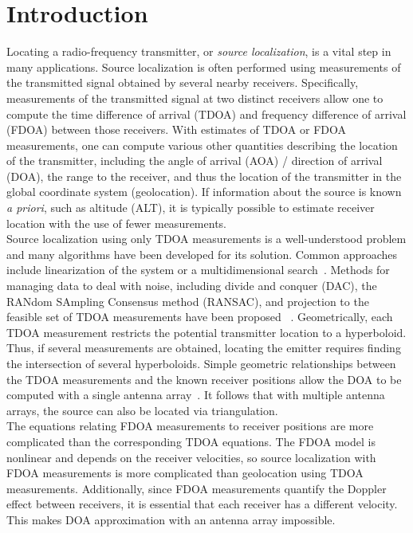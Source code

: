 \section{Introduction}
\label{s:intro}
Locating a radio-frequency transmitter, or \emph{source localization}, is a vital step in many applications. Source localization is often performed using measurements of the transmitted signal obtained by several nearby receivers. Specifically, measurements of the transmitted signal at two distinct receivers allow one to compute the time difference of arrival (TDOA) and frequency difference of arrival (FDOA) between those receivers. With estimates of TDOA or FDOA measurements, one can compute various other quantities describing the location of the transmitter, including the angle of arrival (AOA) / direction of arrival (DOA), the range to the receiver, and thus the location of the transmitter in the global coordinate system (geolocation). If information about the source is known {\em a priori}, such as altitude (ALT), it is typically possible to estimate receiver location with the use of fewer measurements.\\

Source localization using only TDOA measurements is a well-understood problem and many algorithms have been developed for its solution. Common approaches include linearization of the system or a multidimensional search~\cite{Torrieri1984}. Methods for managing data to deal with noise, including divide and conquer (DAC), the RANdom SAmpling Consensus method (RANSAC), and projection to the feasible set of TDOA measurements have been proposed ~\cite{Cameron,Abel1990,Li2009,Compagnoni2017}. Geometrically, each TDOA measurement restricts the potential transmitter location to a hyperboloid. Thus, if several measurements are obtained, locating the emitter requires finding the intersection of several hyperboloids. Simple geometric relationships between the TDOA measurements and the known receiver positions allow the DOA to be computed with a single antenna array~\cite{Benesty2008}. It follows that with multiple antenna arrays, the source can also be located via triangulation. \\

The equations relating FDOA measurements to receiver positions are more complicated than the corresponding TDOA equations. The FDOA model is nonlinear and depends on the receiver velocities, so source localization with FDOA measurements is more complicated than geolocation using TDOA measurements. Additionally, since FDOA measurements quantify the Doppler effect between receivers, it is essential that each receiver has a different velocity. This makes DOA approximation with an antenna array impossible. \\

